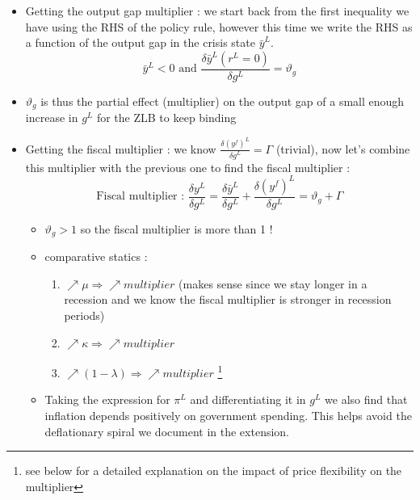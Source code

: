 \documentclass{article}
\begin{document}
\begin{itemize}
    \item Getting the output gap multiplier : we start back from the first inequality we have using the RHS of the policy rule, however this time we write the RHS as a function of the output gap in the crisis state $\bar{y}^L$. 
    \begin{equation}
        \bar{y}^L <0 \text{ and }\frac{\delta\bar{y}^L(r^L=0)}{\delta g^L} =\vartheta_g
    \end{equation}
    \item $\vartheta_g$ is thus the partial effect (multiplier) on the output gap of a small enough increase in $g^L$ for the ZLB to keep binding 
    \item Getting the fiscal multiplier : we know $\frac{\delta(y^f)^L}{\delta g^L}=\Gamma$ (trivial), now let's combine this multiplier with the previous one to find the fiscal multiplier :
    \begin{equation}
        \text{Fiscal multiplier : } \frac{\delta y^L}{\delta g^L} = \frac{\delta\bar{y}^L}{\delta g^L} + \frac{\delta(y^f)^L}{\delta g^L} = \vartheta_g+\Gamma
    \end{equation}
    \begin{takebox}
    \begin{itemize}
        \item  $\vartheta_g>1$ so the fiscal multiplier is more than 1 ! 
        \item comparative statics :
        \begin{enumerate}
            \item $\nearrow \mu \Longrightarrow \nearrow multiplier$ (makes sense since we stay longer in a recession and we know the fiscal multiplier is stronger in recession periods)
            \item $\nearrow \kappa \Longrightarrow \nearrow multiplier$
            \item $\nearrow (1-\lambda)\Longrightarrow \nearrow multiplier$ \footnote{see below for a detailed explanation on the impact of price flexibility on the multiplier}
        \end{enumerate}
        \item Taking the expression for $\pi^L$ and differentiating it in $g^L$ we also find that inflation depends positively on government spending. This helps avoid the deflationary spiral we document in the extension. 
    \end{itemize}  
    \end{takebox}
\end{itemize}
\end{document}
